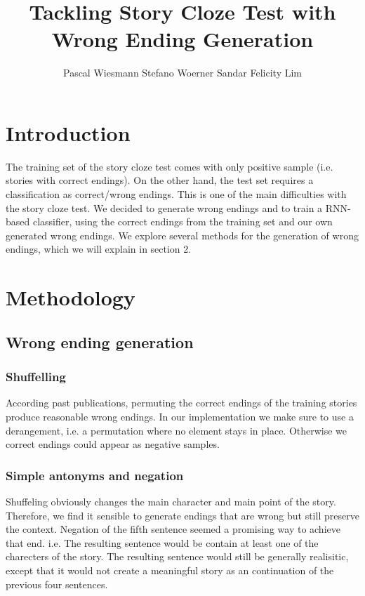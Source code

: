 \documentclass{article}
\title{Tackling Story Cloze Test with Wrong Ending Generation}
\author{Pascal Wiesmann \qquad Stefano Woerner \qquad Sandar Felicity Lim}
\begin{document}

\maketitle


\section{Introduction}

The training set of the story cloze test comes with only positive sample (i.e. stories with correct endings). On the other hand, the test set requires a classification as correct/wrong endings. This is one of the main difficulties with the story cloze test. We decided to generate wrong endings and to train a RNN-based classifier, using the correct endings from the training set and our own generated wrong endings. We explore several methods for the generation of wrong endings, which we will explain in section 2.

\section{Methodology}


\subsection{Wrong ending generation}

\subsubsection{Shuffelling} According past publications\cite{top4}, permuting the correct endings of the training stories produce reasonable wrong endings. In our implementation we make sure to use a derangement, i.e. a permutation where no element stays in place. Otherwise we correct endings could appear as negative samples.

\subsubsection{Simple antonyms and negation}

Shuffeling obviously changes the main character and main point of the story. Therefore, we find it sensible to generate endings that are wrong but still preserve the context. Negation of the fifth sentence seemed a promising way to achieve that end. i.e. The resulting sentence would be contain at least one of the charecters of the story. The resulting sentence would still be generally realisitic, except that it would not create a meaningful story as an continuation of the previous four sentences. 
\end{document}
